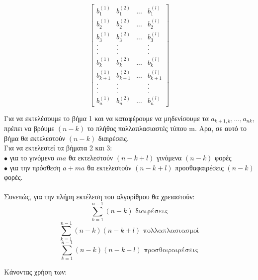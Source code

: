 \documentclass[12pt]{article}
\begin{document}
$$\begin{bmatrix}
b_{1}^{(1)} & b_{1}^{(2)} & ... & b_{1}^{(l)}\\
b_{2}^{(1)} & b_{2}^{(2)} & ... & b_{2}^{(l)}\\
b_{3}^{(1)} & b_{3}^{(2)} & ... & b_{3}^{(l)}\\
. & . &  & .\\
. & . &  & .\\
. & . &  & .\\
b_{k}^{(1)} & b_{k}^{(2)} & ... & b_{k}^{(l)}\\
b_{k+1}^{(1)} & b_{k+1}^{(2)} & ... & b_{k+1}^{(l)}\\
. & . &  & .\\
. & . &  & .\\
. & . &  & .\\
b_{n}^{(1)} & b_{n}^{(2)} & ... & b_{n}^{(l)}
\end{bmatrix}
$$

Για να εκτελέσουμε το βήμα 1 και να καταφέρουμε να μηδενίσουμε τα $a_{k+1,k},...,a_{nk}$, πρέπει να βρόυμε $(n-k)$ το πλήθος πολλαπλασιαστές τύπου m. Αρα, σε αυτό το βήμα θα εκτελεστούν $(n-k)$ διαιρέσεις. \\

Για να εκτελεστεί τα βήματα 2 και 3: \\

$ \bullet $ για το γινόμενο $ma$ θα εκτελεστούν $(n-k+l)$ γινόμενα $(n-k)$ φορές    \\

$ \bullet $ για την πρόσθεση $a+ma$ θα εκτελεστούν $(n-k+l)$ προσθαφαιρέσεις $(n-k)$ φορές. \\ \\

Συνεπώς, για την πλήρη εκτέλεση του αλγορίθμου θα χρειαστούν:
$$ \sum_{k=1}^{n-1} {(n-k)}	\mbox{	διαιρέσεις}$$
$$\sum_{k=1}^{n-1} {(n-k)(n-k+l)} \mbox{	πολλαπλασιασμοί} $$
$$\sum_{k=1}^{n-1} {(n-k)(n-k+l)} \mbox{	προσθαφαιρέσεις} $$

Κάνοντας χρήση των: \\
\end{document}
